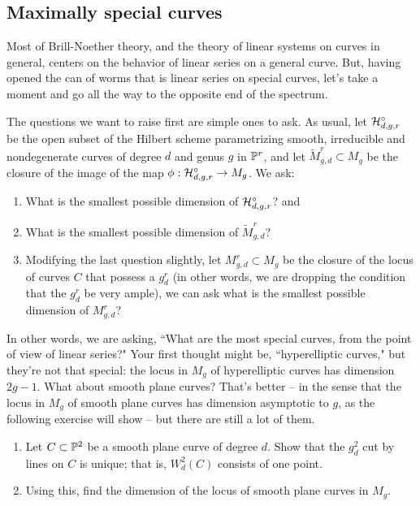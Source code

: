 \subsection{Maximally special  curves} Most of Brill-Noether theory, and the theory of linear systems on curves in general, centers on the behavior of linear series on a general curve. But, having opened the can of worms that is linear series on special curves, let's take a moment and go all the way to the opposite end of the spectrum.

The questions we want to raise first are simple ones to ask. As usual, let $\cH^\circ_{d,g,r}$ be the open subset of the Hilbert scheme parametrizing smooth, irreducible and nondegenerate curves of degree $d$ and genus $g$ in $\PP^r$, and let $\tilde M^r_{g,d} \subset M_g$ be the closure of the image of the map $\phi : \cH^\circ_{d,g,r}\to M_g$. We ask:
\begin{enumerate}
\item What is the smallest possible dimension of $\cH^\circ_{d,g,r}$? \; and
\item What is the smallest possible dimension of $\tilde M^r_{g,d}$?
\item Modifying the last question slightly, let $M^r_{g,d} \subset M_g$ be the closure of the locus of curves $C$ that possess a $g^r_d$ (in other words, we are dropping the condition that the $g^r_d$ be very ample), we can ask what is the smallest possible dimension of $M^r_{g,d}$?
\end{enumerate}

In other words, we are asking, ``What are the most special curves, from the point of view of linear series?" Your first thought might be, ``hyperelliptic curves," but they're not that special: the locus in $M_g$ of hyperelliptic curves has dimension $2g-1$. What about smooth plane curves? That's better -- in the sense that the locus in $M_g$ of smooth plane curves has dimension asymptotic to $g$, as the following exercise will show -- but there are still a lot of them.

\begin{exercise}
\begin{enumerate}
\item Let $C \subset \PP^2$ be a smooth plane curve of degree $d$. Show that the $g^2_d$ cut by lines on $C$ is unique; that is, $W^2_d(C)$ consists of one point.
\item Using this, find the dimension of the locus of smooth plane curves in $M_g$.
\end{enumerate}
\end{exercise}

